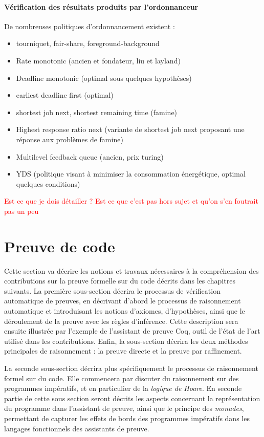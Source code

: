 		\paragraph{Vérification des résultats produits par l'ordonnanceur}
		De nombreuses politiques d'ordonnancement existent :
		\begin{itemize}
			\item{tourniquet, fair-share, foreground-background }
			\item{Rate monotonic (ancien et fondateur, liu et layland)}
			\item{Deadline monotonic (optimal sous quelques hypothèses)}
			\item{earliest deadline first (optimal)}
			\item{shortest job next, shortest remaining time (famine)}
			\item{Highest response ratio next (variante de shortest job next proposant une réponse aux problèmes de famine)}
			\item{Multilevel feedback queue (ancien, prix turing)}
			\item{YDS (politique visant à minimiser la consommation énergétique, optimal quelques conditions)}
		\end{itemize}
		\textcolor{red}{Est ce que je dois détailler ? Est ce que c'est pas hors sujet et qu'on s'en foutrait pas un peu}

	\section{Preuve de code}

	Cette section va décrire les notions et travaux nécessaires à la compréhension des contributions sur la preuve formelle sur du code décrits dans les chapitres suivants. La première sous-section décrira le processus de vérification automatique de preuves, en décrivant d'abord le processus de raisonnement automatique et introduisant les notions d'axiomes, d'hypothèses, ainsi que le déroulement de la preuve avec les règles d'inférence. Cette description sera ensuite illustrée par l'exemple de l'assistant de preuve Coq, outil de l'état de l'art utilisé dans les contributions. Enfin, la sous-section décrira les deux méthodes principales de raisonnement : la preuve directe et la preuve par raffinement.

	La seconde sous-section décrira plus spécifiquement le processus de raisonnement formel sur du code. Elle commencera par discuter du raisonnement sur des programmes impératifs, et en particulier de la \emph{logique de Hoare}. En seconde partie de cette sous section seront décrits les aspects concernant la représentation du programme dans l'assistant de preuve, ainsi que le principe des \emph{monades}, permettant de capturer les effets de bords des programmes impératifs dans les langages fonctionnels des assistants de preuve.

